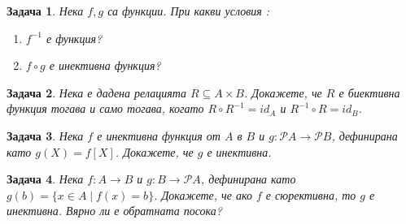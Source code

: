 \documentclass[a4paper]{article}
\newtheorem{problem}{Задача}
\newcommand{\Z}{\mathbb{Z}}
\newcommand{\Ps}{\mathscr{P}}
\begin{document}
\begin{problem}%
  Нека $f,g$ са функции. При какви условия :
  \begin{enumerate}
  \item
    $f^{-1}$ е функция?
  \item
    $f\circ g$ е инективна функция?
\end{enumerate}
\end{problem}



\begin{problem}
  Нека е дадена релацията $R\subseteq A\times B$.
  Докажете, че $R$ е биективна функция тогава и само тогава, когато $R\circ R^{-1} = id_A$ и $R^{-1}\circ R = id_B$.
\end{problem}

\begin{problem}
  Нека $f$ е инективна функция от $A$ в $B$ и $g:\Ps A \rightarrow \Ps B$, дефинирана като $g(X) = f[X]$.
  Докажете, че $g$ е инективна.
\end{problem}

\begin{problem}
  Нека $f:A\rightarrow B$ и $g:B\rightarrow\Ps A$, дефинирана като $g(b) = \{x\in A\mid f(x) = b\}$.
  Докажете, че ако $f$ е сюрективна, то $g$ е инективна.
  Вярно ли е обратната посока?
\end{problem}
\end{document}
